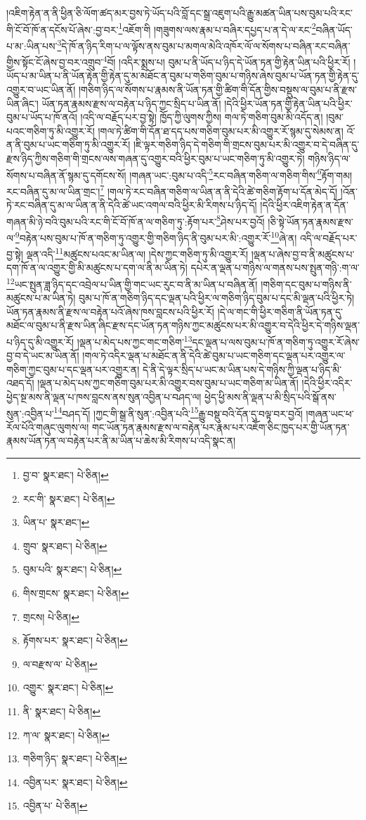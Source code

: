 །འཇིག་རྟེན་ན་ནི་ཕྱིན་ཅི་ལོག་ཚད་མར་བྱས་ཏེ་ཡོད་པའི་བློ་དང་སྒྲ་འཇུག་པའི་རྒྱུ་མཚན་ཡིན་པས་བུམ་པའི་རང་གི་ངོ་བོ་ཁོ་ན་དངོས་པོ་ཞེས་:བྱ་བར་\footnote{བྱ་བ་  སྣར་ཐང་།  པེ་ཅིན། }འཇོག་གི །གཟུགས་ལས་རྣམ་པ་བཞིར་དཔྱད་པ་ན་དེ་ལ་རང་\footnote{རང་གི་  སྣར་ཐང་།  པེ་ཅིན། }བཞིན་ཡོད་པ་མ་:ཡིན་པས་\footnote{ཡིན་པ་  སྣར་ཐང་། }དེ་ཁོ་ན་ཉིད་རིག་པ་ལ་ལྟོས་ནས་བུམ་པ་མགལ་མེའི་འཁོར་ལོ་ལ་སོགས་པ་བཞིན་རང་བཞིན་གྱིས་སྟོང་ངོ་ཞེས་བྱ་བར་འགྲུབ་\footnote{གྲུབ་  སྣར་ཐང་།  པེ་ཅིན། }བོ། །འདིར་སྨྲས་པ། བུམ་པ་ནི་ཡོད་པ་ཉིད་དེ་ཡོན་ཏན་གྱི་རྟེན་ཡིན་པའི་ཕྱིར་རོ། །ཡོད་པ་མ་ཡིན་པ་ནི་ཡོན་རྟེན་གྱི་རྟེན་དུ་མ་མཐོང་ན་བུམ་པ་གཅིག་བུམ་པ་གཉིས་ཞེས་བུམ་པ་ཡོན་ཏན་གྱི་རྟེན་དུ་འགྱུར་བ་ཡང་ཡིན་ནོ། །གཅིག་ཉིད་ལ་སོགས་པ་རྣམས་ནི་ཡོན་ཏན་གྱི་ཚིག་གི་དོན་གྱིས་བསྡུས་ལ་བུམ་པ་ནི་རྫས་ཡིན་ཞིང་། ཡོན་ཏན་རྣམས་རྫས་ལ་བརྟེན་པ་ཉིད་ཀྱང་སྲིད་པ་ཡིན་ནོ། །དེའི་ཕྱིར་ཡོན་ཏན་གྱི་རྟེན་ཡིན་པའི་ཕྱིར་བུམ་པ་ཡོད་པ་ཁོ་ནའོ། །འདི་ལ་བརྗོད་པར་བྱ་སྟེ། ཁྱོད་ཀྱི་ལུགས་ཀྱིས། གལ་ཏེ་གཅིག་བུམ་མི་འདོད་ན། །བུམ་པའང་གཅིག་ཏུ་མི་འགྱུར་རོ། །གལ་ཏེ་ཚིག་གི་དོན་ཐ་དད་པས་གཅིག་བུམ་པར་མི་འགྱུར་རོ་སྙམ་དུ་སེམས་ན། འོ་ན་ནི་བུམ་པ་ཡང་གཅིག་ཏུ་མི་འགྱུར་རོ། །ཇི་ལྟར་གཅིག་ཉིད་དེ་གཅིག་གི་གྲངས་བུམ་པར་མི་འགྱུར་བ་དེ་བཞིན་དུ་རྫས་ཉིད་ཀྱིས་གཅིག་གི་གྲངས་ལས་གཞན་དུ་འགྱུར་བའི་ཕྱིར་བུམ་པ་ཡང་གཅིག་ཏུ་མི་འགྱུར་ཏེ། གཉིས་ཉིད་ལ་སོགས་པ་བཞིན་ནོ་སྙམ་དུ་དགོངས་སོ། །གཞན་ཡང་:བུམ་པ་འདི་\footnote{བུམ་པའི་  སྣར་ཐང་།  པེ་ཅིན། }རང་བཞིན་གཅིག་ལ་གཅིག་གིས་\footnote{གིས་གྲངས་  སྣར་ཐང་།  པེ་ཅིན། }རྟོག་གམ། རང་བཞིན་དུ་མ་ལ་ཡིན་གྲང་།\footnote{གྲངས།  པེ་ཅིན། } །གལ་ཏེ་རང་བཞིན་གཅིག་ལ་ཡིན་ན་ནི་དེའི་ཚེ་གཅིག་རྟོག་པ་དོན་མེད་དོ། །འོན་ཏེ་རང་བཞིན་དུ་མ་ལ་ཡིན་ན་ནི་དེའི་ཚེ་ཡང་འགལ་བའི་ཕྱིར་མི་རིགས་པ་ཉིད་དོ། །དེའི་ཕྱིར་འཇིག་རྟེན་ན་དོན་གཞན་མི་ཉེ་བའི་བུམ་པའི་རང་གི་ངོ་བོ་ཁོ་ན་ལ་གཅིག་ཏུ་:རྟོག་པར་\footnote{རྟོགས་པར་  སྣར་ཐང་།  པེ་ཅིན། }ཤེས་པར་བྱའོ། །ཅི་སྟེ་ཡོན་ཏན་རྣམས་རྫས་ལ་\footnote{ལ་བརྫས་ལ་  པེ་ཅིན། }བརྟེན་པས་བུམ་པ་ཁོ་ན་གཅིག་ཏུ་འགྱུར་གྱི་གཅིག་ཉིད་ནི་བུམ་པར་མི་:འགྱུར་རོ་\footnote{འགྱུར་  སྣར་ཐང་།  པེ་ཅིན། }ཞེ་ན། འདི་ལ་བརྗོད་པར་བྱ་སྟེ། ལྡན་འདི་\footnote{ནི་  སྣར་ཐང་།  པེ་ཅིན། }མཚུངས་པའང་མ་ཡིན་ལ། །དེས་ཀྱང་གཅིག་ཏུ་མི་འགྱུར་རོ། །ལྡན་པ་ཞེས་བྱ་བ་ནི་མཚུངས་པ་དག་ཁོ་ན་ལ་འགྱུར་གྱི་མི་མཚུངས་པ་དག་ལ་ནི་མ་ཡིན་ཏེ། དཔེར་ན་ལྡན་པ་གཉིས་ལ་གནས་པས་སྤུན་གཉི་:ག་ལ་\footnote{ཀ་ལ་  སྣར་ཐང་།  པེ་ཅིན། }ཡང་སྤུན་ཟླ་ཉིད་དང་འབྲེལ་པ་ཡིན་གྱི་གང་ཡང་རུང་བ་ནི་མ་ཡིན་པ་བཞིན་ནོ། །གཅིག་དང་བུམ་པ་གཉིས་ནི་མཚུངས་པ་མ་ཡིན་ཏེ། བུམ་པ་ཁོ་ན་གཅིག་ཉིད་དང་ལྡན་པའི་ཕྱིར་ལ་གཅིག་ཉིད་བུམ་པ་དང་མི་ལྡན་པའི་ཕྱིར་ཏེ། ཡོན་ཏན་རྣམས་ནི་རྫས་ལ་བརྟེན་པའོ་ཞེས་ཁས་བླངས་པའི་ཕྱིར་རོ། །དེ་ལ་གང་གི་ཕྱིར་གཅིག་ནི་ཡོན་ཏན་དུ་མཐོང་ལ་བུམ་པ་ནི་རྫས་ཡིན་ཞིང་རྫས་དང་ཡོན་ཏན་གཉིས་ཀྱང་མཚུངས་པར་མི་འགྱུར་བ་དེའི་ཕྱིར་དེ་གཉིས་ལྡན་པ་ཉིད་དུ་མི་འགྱུར་རོ། །ལྡན་པ་མེད་པས་ཀྱང་གང་གཅིག་\footnote{གཅིག་ཉིད་  སྣར་ཐང་།  པེ་ཅིན། }དང་ལྡན་པ་ལས་བུམ་པ་ཁོ་ན་གཅིག་ཏུ་འགྱུར་རོ་ཞེས་བྱ་བ་དེ་ཡང་མ་ཡིན་ནོ། །གལ་ཏེ་འདིར་ལྡན་པ་མཐོང་ན་ནི་དེའི་ཚེ་བུམ་པ་ཡང་གཅིག་དང་ལྡན་པར་འགྱུར་ལ་གཅིག་ཀྱང་བུམ་པ་དང་ལྡན་པར་འགྱུར་ན། དེ་ནི་དེ་ལྟར་སྲིད་པ་ཡང་མ་ཡིན་པས་དེ་གཉིས་ཀྱི་ལྡན་པ་ཉིད་མི་འཐད་དོ། །ལྡན་པ་མེད་པས་ཀྱང་གཅིག་བུམ་པར་མི་འགྱུར་བས་བུམ་པ་ཡང་གཅིག་མ་ཡིན་ནོ། །དེའི་ཕྱིར་འདིར་ཕྱེད་སྔ་མས་ནི་ལྡན་པ་ཁས་བླངས་ནས་སུན་འབྱིན་པ་བཤད་ལ། ཕྱེད་ཕྱི་མས་ནི་ལྡན་པ་མི་སྲིད་པའི་སྒོ་ནས་སུན་:འབྱིན་པ་\footnote{འབྱིན་པར་  སྣར་ཐང་།  པེ་ཅིན། }བཤད་དོ། །ཀྱང་གི་སྒྲ་ནི་སུན་:འབྱིན་པའི་\footnote{འབྱིན་པ་  པེ་ཅིན། }རྒྱུ་བསྡུ་བའི་དོན་དུ་བལྟ་བར་བྱའོ། །གཞན་ཡང་ཕ་རོལ་པོའི་གཞུང་ལུགས་ལ། གང་ཡོན་ཏན་རྣམས་རྫས་ལ་བརྟེན་པར་རྣམ་པར་འཇོག་ཅིང་ཁྱད་པར་གྱི་ཡོན་ཏན་རྣམས་ཡོན་ཏན་ལ་བརྟེན་པར་ནི་མ་ཡིན་པ་ཆེས་མི་རིགས་པ་འདི་སྣང་ན། 